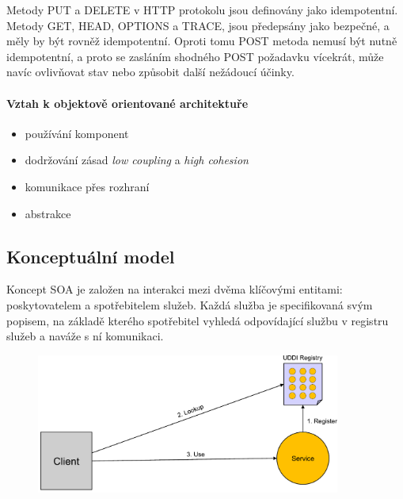 Metody PUT a DELETE v HTTP protokolu jsou definovány jako idempotentní. Metody GET, HEAD, OPTIONS a TRACE, jsou předepsány jako bezpečné, a měly by být rovněž idempotentní. Oproti tomu POST metoda nemusí být nutně idempotentní, a proto se zasláním shodného POST požadavku vícekrát, může navíc ovlivňovat stav nebo způsobit další nežádoucí účinky.

\paragraph{Vztah k objektově orientované architektuře}
\begin{itemize}[itemsep=0px]
\item používání komponent
\item dodržování zásad \textit{low coupling} a \textit{high cohesion}
\item komunikace přes rozhraní
\item abstrakce
\end{itemize}

\subsection{Konceptuální model}
Koncept SOA je založen na interakci mezi dvěma klíčovými entitami: poskytovatelem a spotřebitelem služeb. Každá služba je specifikovaná svým popisem, na základě kterého spotřebitel vyhledá odpovídající službu v registru služeb a naváže s ní komunikaci.

\begin{figure}[h!]
\centering
\includegraphics[width=100mm]{09/images/uddi-concept}
\end{figure}
